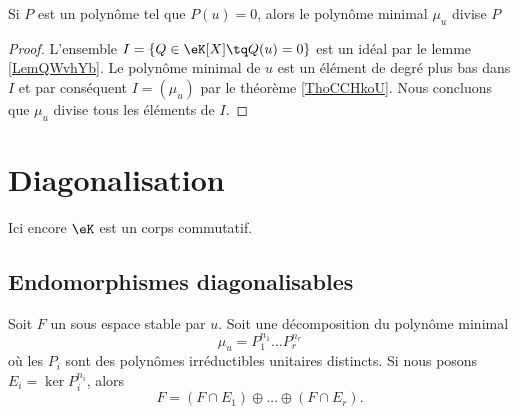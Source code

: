 \begin{proposition}     \label{PropAnnncEcCxj}
    Si \( P\) est un polynôme tel que \( P(u)=0\), alors le polynôme minimal \( \mu_u\) divise \( P\)
\end{proposition}

\begin{proof}
    L'ensemble \( I=\{ Q\in \eK[X]\tq Q(u)=0 \}\) est un idéal par le lemme \ref{LemQWvhYb}. Le polynôme minimal de \( u\) est un élément de degré plus bas dans \( I\) et par conséquent \( I=(\mu_u)\) par le théorème \ref{ThoCCHkoU}. Nous concluons que \( \mu_u\) divise tous les éléments de \( I\).
\end{proof}

\section{Diagonalisation}

Ici encore \( \eK\) est un corps commutatif.

\subsection{Endomorphismes diagonalisables}

\begin{lemma}       \label{LemgnaEOk}
    Soit \( F\) un sous espace stable par \( u\). Soit une décomposition du polynôme minimal
    \begin{equation}
        \mu_u=P_1^{n_1}\ldots P_r^{n_r}
    \end{equation}
    où les \( P_i\) sont des polynômes irréductibles unitaires distincts. Si nous posons \( E_i=\ker P_i^{n_i}\), alors
    \begin{equation}
        F=(F\cap E_1)\oplus\ldots \oplus(F\cap E_r).
    \end{equation}
\end{lemma}

